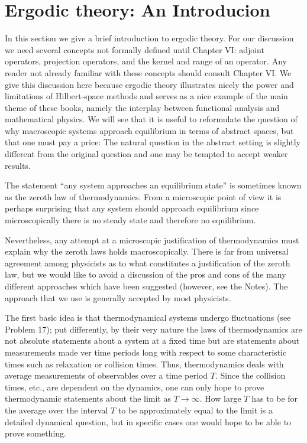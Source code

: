 \section{Ergodic theory: An Introducion}

In this section we give a brief introduction to ergodic theory. For our discussion we need several concepts not formally defined until Chapter VI: adjoint operators, projection operators, and the kernel and range of an operator. Any reader not already familiar with these concepts should consult Chapter VI. We give this discussion here because ergodic theory illustrates nicely the power and limitations of Hilbert-space methods and serves as a nice example of the main theme of these books, namely the interplay between functional analysis and mathematical physics. We will see that it is useful to reformulate the question of why macroscopic systems approach equilibrium in terms of abstract spaces, but that one must pay a price: The natural question in the abstract setting is slightly different from the original question and one may be tempted to accept weaker results. 

The statement \enquote{any system approaches an equilibrium state} is sometimes known as the zeroth law of thermodynamics. From a microscopic point of view it is perhaps surprising that any system should approach equilibrium since microscopically there is no steady state and therefore no equilibrium.

Nevertheless, any attempt at a microscopic justification of thermodynamics must explain why the zeroth laws holds macroscopically. There is far from universal agreement among physicists as to what constitutes a justification of the zeroth law, but we would like to avoid a discussion of the pros and cons of the many different approaches which have been suggested (however, see the Notes). The approach that we use is generally accepted by most physicists.

The first basic idea is that thermodynamical systems undergo fluctuations (see Problem 17); put differently, by their very nature the laws of thermodynamics are not absolute statements about a system at a fixed time but are statements about measurements made ver time periods long with respect to some characteristic times such as relaxation or collision times. Thus, thermodynamics deals with average measurements of observables over a time period $T$. Since the collision times, etc., are dependent on the dynamics, one can only hope to prove thermodynamic statements about the limit as $T \rightarrow \infty$.
How large $T$ has to be for the average over the interval $T$ to be approximately equal to the limit is a detailed dynamical question, but in specific cases one would hope to be able to prove something.

